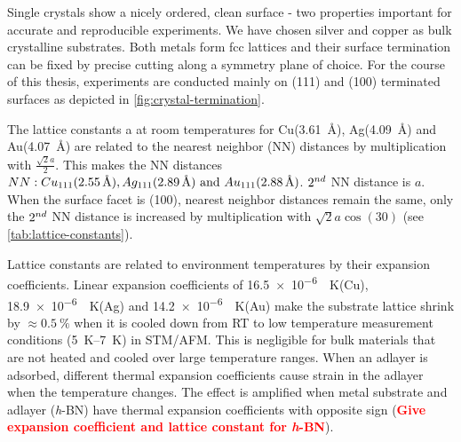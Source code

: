 \label{sec:single-crystal}
Single crystals show a nicely ordered, clean surface - two properties important for accurate and reproducible experiments. We have chosen silver and copper as bulk crystalline substrates. Both metals form fcc lattices and their surface termination can be fixed by precise cutting along a symmetry plane of choice. For the course of this thesis, experiments are conducted mainly on (111) and (100) terminated surfaces as depicted in \autoref{fig:crystal-termination}.

The lattice constants a at room temperatures for  Cu(\SI{3,61}{\angstrom}), Ag(\SI{4,09}{\angstrom}) and Au(\SI{4,07}{\angstrom}) \cite{_ptable} are related to the nearest neighbor (NN) distances by multiplication with $\frac{\sqrt{2}a}{2}$. This makes the NN distances $NN: Cu_{111}(\SI{2,55}{\angstrom}), Ag_{111}(\SI{2,89}{\angstrom})\textnormal{ and } Au_{111}(\SI{2,88}{\angstrom})$. $\textnormal{2}^{nd}$ NN distance is $a$. When the surface facet is (100), nearest neighbor distances remain the same, only the $\textnormal{2}^{nd}$ NN distance is increased by multiplication with $\sqrt{2}a\cos(30)$ (see \autoref{tab:lattice-constants}).

Lattice constants are related to environment temperatures by their expansion coefficients.
Linear expansion coefficients of \SI{16,5e-6}{\per \kelvin}(Cu), \SI{18,9e-6}{\per \kelvin}(Ag) and \SI{14,2e-6}{\per \kelvin}(Au) make the substrate lattice shrink by $\approx \SI{0,5}{\percent}$ when it is cooled down from RT to low temperature measurement conditions (\SIrange{5}{7}{\kelvin}) in STM/AFM. This is negligible for bulk materials that are not heated and cooled over large temperature ranges. When an adlayer is adsorbed, different thermal expansion coefficients cause strain in the adlayer when the temperature changes. The effect is amplified when metal substrate and adlayer (\textit{h}-BN)
have thermal expansion coefficients with opposite sign (\textcolor{red}{\textbf{Give expansion coefficient and lattice constant for \textit{h}-BN}}).\cite{farwick_zum_hagen_structure_2016}

